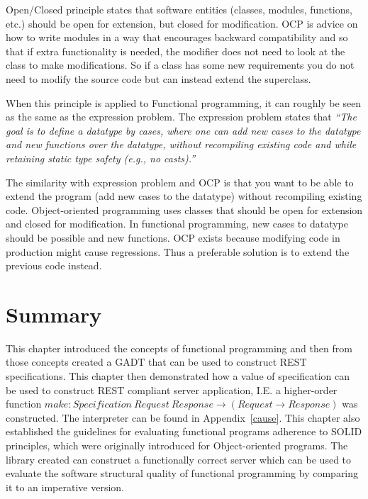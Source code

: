 Open/Closed principle states that software entities (classes, modules,
functions, etc.) should be open for extension, but closed for modification. OCP
is advice on how to write modules in a way that encourages backward
compatibility and so that if extra functionality is needed, the modifier does
not need to look at the class to make modifications. So if a class has some new
requirements you do not need to modify the source code but can instead extend
the superclass.

When this principle is applied to Functional programming, it can roughly be
seen as the same as the expression problem. The expression problem states that
\textit{``The goal is to define a datatype by cases, where one can add new cases
    to the datatype and new functions over the datatype, without recompiling
existing code and while retaining static type safety (e.g., no casts).''}
~\cite{torgersen2004expression}

The similarity with expression problem and OCP is that you want to be able to
extend the program (add new cases to the datatype) without recompiling existing
code.  Object-oriented programming uses classes that should be open for
extension and closed for modification. In functional programming, new cases to
datatype should be possible and new functions. OCP exists because modifying code
in production might cause regressions. Thus a preferable solution is to extend
the previous code instead.


\section{Summary}

This chapter introduced the concepts of functional programming and then from
those concepts created a GADT that can be used to construct REST
specifications.  This chapter then demonstrated how a value of specification
can be used to construct REST compliant server application, I.E. a higher-order
function $make : Specification\ Request\ Response \rightarrow
(Request\rightarrow Response)$ was constructed. The interpreter can be found in
Appendix~\ref{cause}. This chapter also established the guidelines for
evaluating functional programs adherence to SOLID principles, which were
originally introduced for Object-oriented programs.  The library created can
construct a functionally correct server which can be used to evaluate the
software structural quality of functional programming by comparing it to an
imperative version. 
